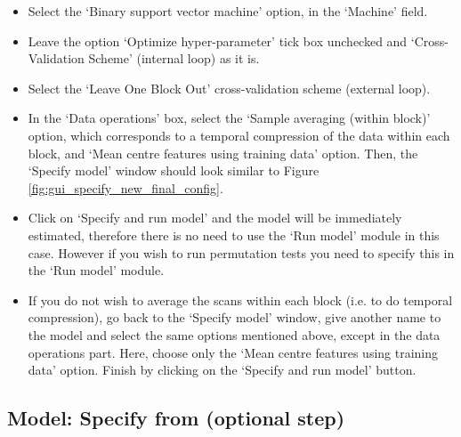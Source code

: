 \begin{itemize}
	\item Select the `Binary support vector machine' option, in the `Machine' field.
	
	\item Leave the option `Optimize hyper-parameter' tick box unchecked and `Cross-Validation Scheme' (internal loop) as it is. 
	
	\item Select the `Leave One Block Out' cross-validation scheme (external loop).
	
	\item In the `Data operations' box, select the `Sample averaging (within block)' option, which corresponds to a temporal compression of the data within each block, and `Mean centre features using training data' option. Then, the `Specify model' window should look similar to Figure \ref{fig:gui_specify_new_final_config}.
	
	\item Click on `Specify and run model' and the model will be immediately estimated, therefore there is no need to use the `Run model' module in this case. However if you wish to run permutation tests you need to specify this in the `Run model' module.

	\item If you do not wish to average the scans within each block (i.e. to do temporal compression), go back to the `Specify model' window, give another name to the model and select the same options mentioned above, except in the data operations part. Here, choose only the `Mean centre features using training data' option. Finish by clicking on the `Specify and run model' button.

\end{itemize}


\subsection{Model: Specify from (optional step)}
\label{gui_specify_model_from}

